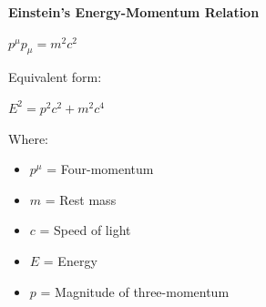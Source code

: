 \documentclass[preview,border=20pt]{standalone}
\begin{document}
\begin{center}
    {\Huge \textbf{Einstein's Energy-Momentum Relation}}
    \vspace{1.5cm}
    
    {\LARGE $ p^\mu p_\mu = m^2 c^2 $}
    
    \vspace{1cm}
    
    {\Large Equivalent form:}
    
    \vspace{0.5cm}
    
    {\LARGE $ E^2 = p^2 c^2 + m^2 c^4 $}
    
    \vspace{1.5cm}
    
    Where:
    \begin{itemize}
        \item $p^\mu$ = Four-momentum
        \item $m$ = Rest mass
        \item $c$ = Speed of light
        \item $E$ = Energy
        \item $p$ = Magnitude of three-momentum
    \end{itemize}
    
\end{center}
\end{document}
